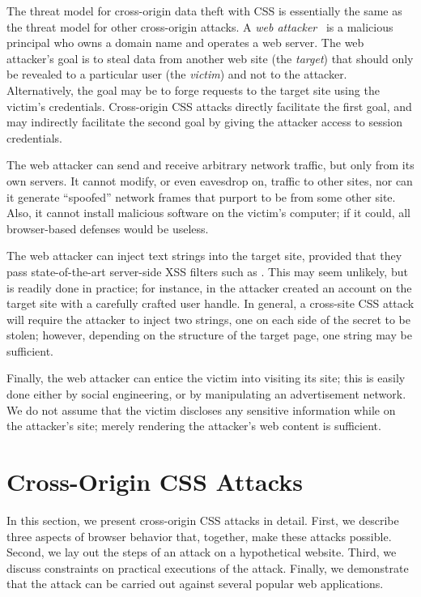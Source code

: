\documentclass{acm_proc_article-sp}
\begin{document}
The threat model for cross-origin data theft with CSS is essentially
the same as the threat model for other cross-origin attacks.  A
\emph{web attacker}~\cite{jackson09thesis} is a malicious principal
who owns a domain name and operates a web server.  The web attacker's
goal is to steal data from another web site (the \emph{target}) that
should only be revealed to a particular user (the \emph{victim}) and
not to the attacker.  Alternatively, the goal may be to forge requests
to the target site using the victim's credentials.  Cross-origin CSS
attacks directly facilitate the first goal, and may indirectly
facilitate the second goal by giving the attacker access to session
credentials.

The web attacker can send and receive arbitrary network traffic, but
only from its own servers.  It cannot modify, or even eavesdrop on,
traffic to other sites, nor can it generate “spoofed” network frames
that purport to be from some other site.  Also, it cannot install
malicious software on the victim's computer; if it could, all
browser-based defenses would be useless.

The web attacker can inject text strings into the target site,
provided that they pass state-of-the-art server-side XSS filters such
as .  This may seem unlikely, but is readily
done in practice; for instance, in \cite{cssxss08} the attacker
created an account on the target site with a carefully crafted user
handle.  In general, a cross-site CSS attack will require the attacker
to inject two strings, one on each side of the secret to be stolen;
however, depending on the structure of the target page, one string may
be sufficient.

Finally, the web attacker can entice the victim into visiting its
site; this is easily done either by social engineering, or by
manipulating an advertisement network.  We do not assume that the
victim discloses any sensitive information while on the attacker's
site; merely rendering the attacker's web content is sufficient.

\section{Cross-Origin CSS Attacks} \label{sec:attacks}

In this section, we present cross-origin CSS attacks in detail.
First, we describe three aspects of browser behavior that, together,
make these attacks possible.  Second, we lay out the steps of an
attack on a hypothetical website.  Third, we discuss constraints on
practical executions of the attack.  Finally, we demonstrate that the
attack can be carried out against several popular web applications.
\end{document}
